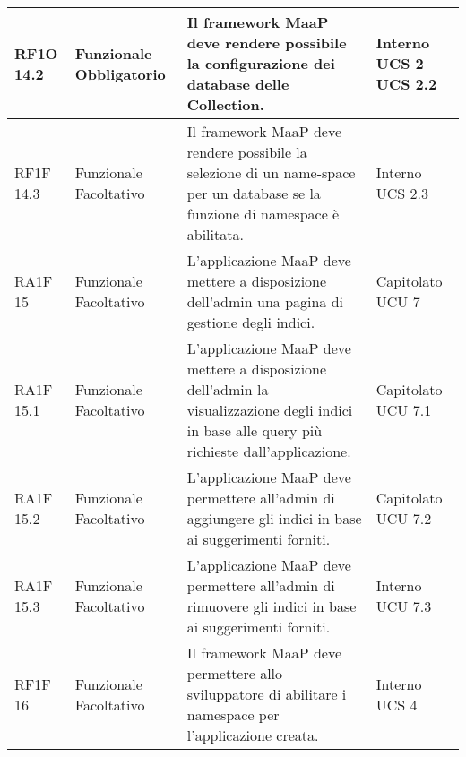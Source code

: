 \begin{center}
\begin{longtable}{ | l | p{2cm} | p{5cm} | p{1.7cm} |}
				RF1O 14.2 & Funzionale \newline  Obbligatorio  & Il framework MaaP deve rendere possibile la configurazione dei database delle Collection. &  Interno \newline  UCS 2 \newline  UCS 2.2 \newline  \\ \hline      
				RF1F 14.3 & Funzionale \newline  Facoltativo  & Il framework MaaP deve rendere possibile la selezione di un name-space per un database se la funzione di namespace è abilitata. &  Interno \newline  UCS 2.3 \newline  \\ \hline      
				RA1F 15 & Funzionale \newline  Facoltativo  & L’applicazione MaaP deve mettere a disposizione dell’admin una pagina di gestione degli indici. &  Capitolato \newline  UCU 7 \newline  \\ \hline      
				RA1F 15.1 & Funzionale \newline  Facoltativo  & L’applicazione MaaP deve mettere a disposizione dell’admin la visualizzazione degli indici in base alle query più richieste dall’applicazione. &  Capitolato \newline  UCU 7.1 \newline  \\ \hline      
				RA1F 15.2 & Funzionale \newline  Facoltativo  & L’applicazione MaaP deve permettere all’admin di aggiungere gli indici in base ai suggerimenti forniti. &  Capitolato \newline  UCU 7.2 \newline  \\ \hline      
				RA1F 15.3 & Funzionale \newline  Facoltativo  & L’applicazione MaaP deve permettere all’admin di rimuovere gli indici in base ai suggerimenti forniti. &  Interno \newline  UCU 7.3 \newline  \\ \hline      
				RF1F 16 & Funzionale \newline  Facoltativo  & Il framework MaaP deve permettere allo sviluppatore di abilitare i namespace per l’applicazione creata. &  Interno \newline  UCS 4 \newline  \\ \hline      

\end{longtable}
\end{center}
